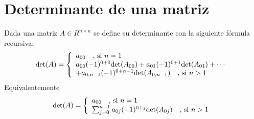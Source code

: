 \documentclass{article}
\begin{document}
\section{Determinante de una matriz}
Dada una matriz $A\in R^{n\times n}$ se define su determinante con la siguiente 
f\'{o}rmula recursiva:
\[
\mbox{det}(A) = \left\{
\begin{array}{l}    
a_{00}\mbox{\rm\ \ \ ,  si }n = 1\\
a_{00}(-1)^{0+0}\mbox{det}(A_{00})+a_{01}(-1)^{0+1}\mbox{det}(A_{01})+\cdots\\
+ a_{0,n-1}(-1)^{0+n-1}\mbox{det}(A_{0,n-1})\mbox{\rm\ \ \ ,  si }n > 1
\end{array}
\right.
\]
Equivalentemente
\[
\mbox{det}(A) = \left\{
\begin{array}{l}    
a_{00}\mbox{\rm\ \ \ ,  si }n = 1\\
\sum_{j=0}^{n-1}a_{0j}(-1)^{0+j}\mbox{det}(A_{0j})\mbox{\rm\ \ \ ,  si }n > 1
\end{array}
\right.
\]
\end{document}
